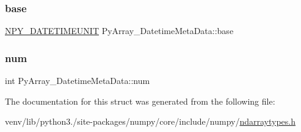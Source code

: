 \subsubsection{\texorpdfstring{base}{base}}
{\footnotesize\ttfamily \hyperlink{ndarraytypes_8h_aae07f47944dfcc29fa3dd32ddb5996c3}{N\+P\+Y\+\_\+\+D\+A\+T\+E\+T\+I\+M\+E\+U\+N\+IT} Py\+Array\+\_\+\+Datetime\+Meta\+Data\+::base}

\mbox{\label{structPyArray__DatetimeMetaData_ab60cb834f25c060d7c98dd26cffc2816}} 
\subsubsection{\texorpdfstring{num}{num}}
{\footnotesize\ttfamily int Py\+Array\+\_\+\+Datetime\+Meta\+Data\+::num}



The documentation for this struct was generated from the following file\+:\begin{DoxyCompactItemize}
\item 
venv/lib/python3./site-\/packages/numpy/core/include/numpy/\hyperlink{ndarraytypes_8h}{ndarraytypes.\+h}\end{DoxyCompactItemize}
